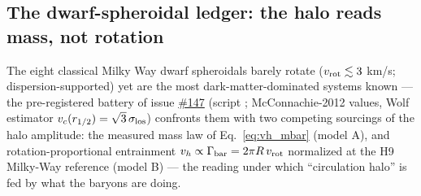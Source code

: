 \documentclass[11pt,a4paper]{article}
\providecommand{\ssvfile}[1]{\hyperref[file:#1]{\texttt{\detokenize{#1}}}}
\providecommand{\ssvissue}[1]{\hyperref[issue:#1]{\##1}}
\begin{document}
\subsection{The dwarf-spheroidal ledger: the halo reads mass, not
rotation}
\label{sec:dsph}

The eight classical Milky Way dwarf spheroidals barely rotate
($v_{\rm rot} \lesssim 3$ km/s; dispersion-supported) yet are the most
dark-matter-dominated systems known --- the pre-registered battery of
issue \ssvissue{147} (script \ssvfile{dsph_ledger}; McConnachie-2012
values, Wolf estimator $v_c(r_{1/2}) = \sqrt{3}\,\sigma_{\rm los}$)
confronts them with two competing sourcings of the halo amplitude:
the measured mass law of Eq.~\eqref{eq:vh_mbar} (model A), and
rotation-proportional entrainment $v_h \propto \Gamma_{\rm bar}
= 2\pi R\,v_{\rm rot}$ normalized at the H9 Milky-Way reference
(model B) --- the reading under which ``circulation halo'' is fed by
what the baryons are doing.
\end{document}
